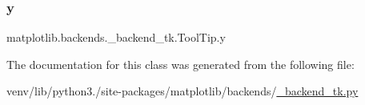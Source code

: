 \subsubsection{\texorpdfstring{y}{y}}
{\footnotesize\ttfamily matplotlib.\+backends.\+\_\+backend\+\_\+tk.\+Tool\+Tip.\+y}



The documentation for this class was generated from the following file\+:\begin{DoxyCompactItemize}
\item 
venv/lib/python3./site-\/packages/matplotlib/backends/\hyperlink{__backend__tk_8py}{\+\_\+backend\+\_\+tk.\+py}\end{DoxyCompactItemize}
